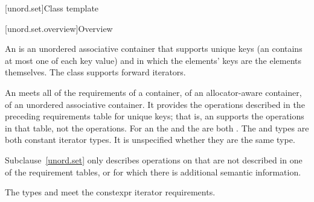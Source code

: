[unord.set]{Class template }%

[unord.set.overview]{Overview}

\pnum
{}%
%
An  is an unordered associative container that
supports unique keys (an  contains at most one of each
key value) and in which the elements' keys are the elements
themselves.
The  class
supports forward iterators.

\pnum
An  meets all of the requirements
of a container,
of an allocator-aware container,
of an unordered associative container.
It provides the operations described in the preceding requirements table for unique keys;
that is, an  supports the  operations in that table,
not the  operations.
For an  the 
and the  are both .
The  and  types are both constant iterator types.
It is unspecified whether they are the same type.

\pnum
Subclause~\ref{unord.set} only describes operations on  that
are not described in one of the requirement tables, or for which there
is additional semantic information.

\pnum
The types  and  meet
the constexpr iterator requirements.

